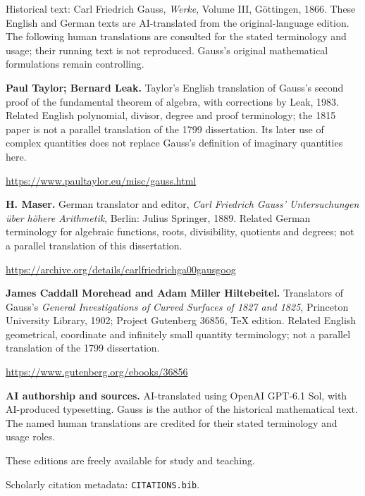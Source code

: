 \clearpage\thispagestyle{empty}\begingroup\small\raggedright
{}\medskip
Historical text: Carl Friedrich Gauss, \emph{Werke}, Volume III, Göttingen, 1866. These English and German texts are AI-translated from the original-language edition. The following human translations are consulted for the stated terminology and usage; their running text is not reproduced. Gauss’s original mathematical formulations remain controlling.
\par\medskip\textbf{Paul Taylor; Bernard Leak.} Taylor’s English translation of Gauss’s second proof of the fundamental theorem of algebra, with corrections by Leak, 1983. Related English polynomial, divisor, degree and proof terminology; the 1815 paper is not a parallel translation of the 1799 dissertation. Its later use of complex quantities does not replace Gauss’s definition of imaginary quantities here.\par
\url{https://www.paultaylor.eu/misc/gauss.html}
\par\medskip\textbf{H. Maser.} German translator and editor, \emph{Carl Friedrich Gauss’ Untersuchungen über höhere Arithmetik}, Berlin: Julius Springer, 1889. Related German terminology for algebraic functions, roots, divisibility, quotients and degrees; not a parallel translation of this dissertation.\par
\url{https://archive.org/details/carlfriedrichga00gausgoog}
\par\medskip\textbf{James Caddall Morehead and Adam Miller Hiltebeitel.} Translators of Gauss’s \emph{General Investigations of Curved Surfaces of 1827 and 1825}, Princeton University Library, 1902; Project Gutenberg 36856, TeX edition. Related English geometrical, coordinate and infinitely small quantity terminology; not a parallel translation of the 1799 dissertation.\par
\url{https://www.gutenberg.org/ebooks/36856}
\par\medskip\textbf{AI authorship and sources.} AI-translated using OpenAI GPT-6.1 Sol, with AI-produced typesetting. Gauss is the author of the historical mathematical text. The named human translations are credited for their stated terminology and usage roles.
\par These editions are freely available for study and teaching.\par
\par\medskip Scholarly citation metadata: \texttt{CITATIONS.bib}.
\par\endgroup\clearpage

